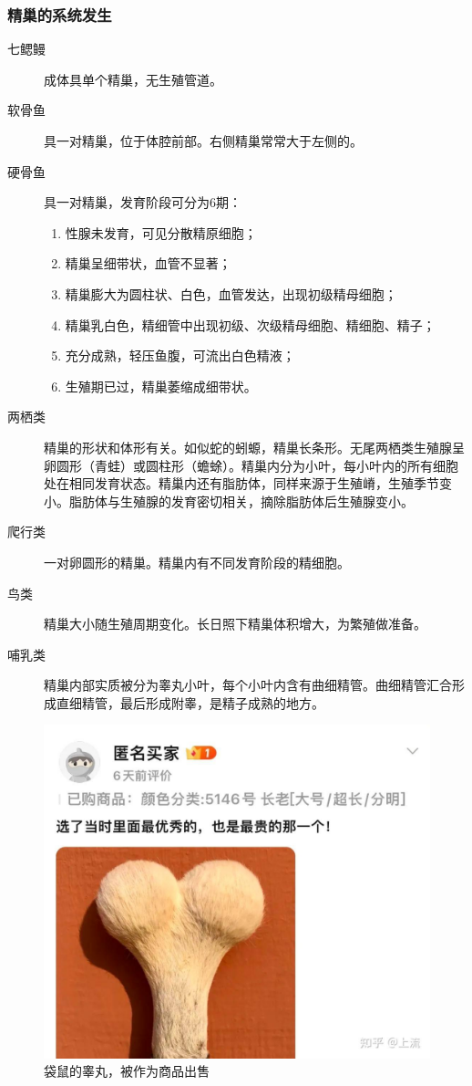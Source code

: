 \subsubsection{精巢的系统发生}

\begin{description}
	\item[七鳃鳗] 成体具单个精巢，无生殖管道。
	\item[软骨鱼] 具一对精巢，位于体腔前部。右侧精巢常常大于左侧的。
	\item[硬骨鱼] 具一对精巢，发育阶段可分为6期：

	\begin{enumerate}[label=\Roman*]
		\item 性腺未发育，可见分散精原细胞；
		\item 精巢呈细带状，血管不显著；
		\item 精巢膨大为圆柱状、白色，血管发达，出现初级精母细胞；
		\item 精巢乳白色，精细管中出现初级、次级精母细胞、精细胞、精子；
		\item 充分成熟，轻压鱼腹，可流出白色精液；
		\item 生殖期已过，精巢萎缩成细带状。
	\end{enumerate}

	\item[两栖类] 精巢的形状和体形有关。如似蛇的蚓螈，精巢长条形。无尾两栖类生殖腺呈卵圆形（青蛙）或圆柱形（蟾蜍）。精巢内分为小叶，每小叶内的所有细胞处在相同发育状态。精巢内还有脂肪体，同样来源于生殖嵴，生殖季节变小。脂肪体与生殖腺的发育密切相关，摘除脂肪体后生殖腺变小。
	\item[爬行类] 一对卵圆形的精巢。精巢内有不同发育阶段的精细胞。
	\item[鸟类] 精巢大小随生殖周期变化。长日照下精巢体积增大，为繁殖做准备。
	\item[哺乳类] 精巢内部实质被分为睾丸小叶，每个小叶内含有曲细精管。曲细精管汇合形成直细精管，最后形成附睾，是精子成熟的地方。
\end{description}

\begin{figure}[htbp]
	\centering
	\includegraphics[width=0.7\linewidth]{Pics/袋鼠的睾丸}
	\caption{袋鼠的睾丸，被作为商品出售}
	\label{fig:ball_of_kangroo}
\end{figure}

